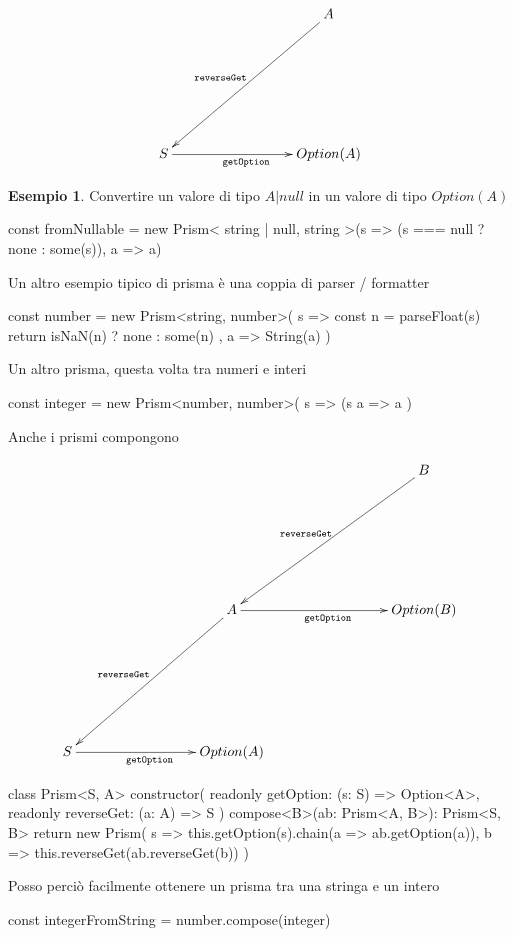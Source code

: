 \documentclass[12pt]{article}
\theoremstyle{definition}
\newtheorem{example}{Esempio}[section]
\newenvironment{code}
  {\vspace{0.5cm} \VerbatimEnvironment\begin{typescriptcode}}
  {\end{typescriptcode} \vspace{0.2cm}}
\begin{document}
\[
\xymatrixrowsep{3cm}
\xymatrixcolsep{3cm}
\xymatrix{
  & A \ar[dl]_{\texttt{reverseGet}} \\
  S \ar[r]_{\texttt{getOption}} & {Option(A)}
}
\]

\begin{example}
Convertire un valore di tipo $A | null$ in un valore di tipo $Option(A)$

\begin{code}
const fromNullable = new Prism<
  string | null,
  string
>(s => (s === null ? none : some(s)), a => a)
\end{code}

\end{example}

Un altro esempio tipico di prisma è una coppia di parser / formatter

\begin{code}
const number = new Prism<string, number>(
  s => {
    const n = parseFloat(s)
    return isNaN(n) ? none : some(n)
  },
  a => String(a)
)
\end{code}

Un altro prisma, questa volta tra numeri e interi

\begin{code}
const integer = new Prism<number, number>(
  s => (s %
  a => a
)
\end{code}

Anche i prismi compongono

\[
\xymatrixrowsep{3cm}
\xymatrixcolsep{3cm}
\xymatrix{
  & & B \ar[dl]_{\texttt{reverseGet}} \\
  & A \ar[dl]_{\texttt{reverseGet}} \ar[r]_{\texttt{getOption}} & {Option(B)} \\
  S \ar[r]_{\texttt{getOption}} & {Option(A)}
}
\]

\begin{code}
class Prism<S, A> {
  constructor(
    readonly getOption: (s: S) => Option<A>,
    readonly reverseGet: (a: A) => S
  ) {}
  compose<B>(ab: Prism<A, B>): Prism<S, B> {
    return new Prism(
      s => this.getOption(s).chain(a => ab.getOption(a)),
      b => this.reverseGet(ab.reverseGet(b))
    )
  }
}
\end{code}

Posso perciò facilmente ottenere un prisma tra una stringa e un intero

\begin{code}
const integerFromString = number.compose(integer)
\end{code}
\end{document}
